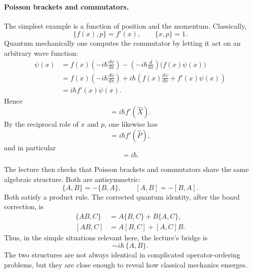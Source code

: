\paragraph{Poisson brackets and commutators.}
The simplest example is a function of position and the momentum. Classically,
\begin{equation}
\{f(x),p\}=f'(x),
\qquad
\{x,p\}=1.
\end{equation}
Quantum mechanically one computes the commutator by letting it act on an arbitrary wave function:
\begin{align}
[f(\hat X),\hat P]\psi(x)
&=
f(x)\left(-i\hbar\frac{d\psi}{dx}\right)
-
\left(-i\hbar\frac{d}{dx}\right)\bigl(f(x)\psi(x)\bigr) \\
&=
f(x)\left(-i\hbar\frac{d\psi}{dx}\right)
+
i\hbar\left(f(x)\frac{d\psi}{dx}+f'(x)\psi(x)\right) \\
&=
i\hbar f'(x)\psi(x).
\end{align}
Hence
\begin{equation}
[f(\hat X),\hat P]=i\hbar f'(\hat X).
\end{equation}
By the reciprocal role of \(x\) and \(p\), one likewise has
\begin{equation}
[\hat X,f(\hat P)]=i\hbar f'(\hat P),
\end{equation}
and in particular
\begin{equation}
[\hat X,\hat P]=i\hbar.
\end{equation}

The lecture then checks that Poisson brackets and commutators share the same algebraic structure. Both are antisymmetric:
\begin{equation}
\{A,B\}=-\{B,A\},
\qquad
[A,B]=-[B,A].
\end{equation}
Both satisfy a product rule. The corrected quantum identity, after the board correction, is
\begin{align}
\{AB,C\} &= A\{B,C\}+B\{A,C\}, \\
[AB,C] &= A[B,C]+[A,C]B.
\end{align}
Thus, in the simple situations relevant here, the lecture's bridge is
\begin{equation}
[A,B]\sim i\hbar\,\{A,B\}.
\end{equation}
The two structures are not always identical in complicated operator-ordering problems, but they are close enough to reveal how classical mechanics emerges.


